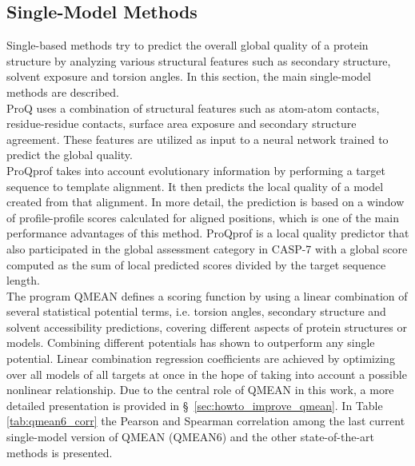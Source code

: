 \subsection{Single-Model Methods}
\label{subsec:single_model_methods}
Single-based methods try to predict the overall global quality of a protein structure by analyzing various structural features such as secondary structure, solvent exposure and torsion angles. In this section, the main single-model methods are described.\\
ProQ \cite{Wallner2007} uses a combination of structural features such as atom-atom contacts, residue-residue contacts, surface area exposure and secondary structure agreement. These features are utilized as input to a neural network trained to predict the global quality.\\
ProQprof \cite{Wallner2007} takes into account evolutionary information by performing a target sequence to template alignment. It then predicts the local quality of a model created from that alignment. In more detail, the prediction is based on a window of profile-profile scores calculated for aligned positions, which is one of the main performance advantages of this method. ProQprof is a local quality predictor that also participated in the global assessment category in CASP-7 with a global score computed as the sum of local predicted scores divided by the target sequence length. \\
The program \gls{QMEAN} \cite{Benkert2007, Benkert2008ab, Benkert2008aa, Tosatto2002} defines a scoring function by using a linear combination of several statistical potential terms, i.e. torsion angles, secondary structure and solvent accessibility predictions, covering different aspects of protein structures or models. Combining different potentials has shown to outperform any single potential. Linear combination regression coefficients are achieved by optimizing over all models of all targets at once in the hope of taking into account a possible nonlinear relationship. Due to the central role of QMEAN in this work, a more detailed presentation is provided in \S~\ref{sec:howto_improve_qmean}. In Table \ref{tab:qmean6_corr} the Pearson and Spearman correlation among the last current single-model version of QMEAN (QMEAN6) and the other state-of-the-art methods is presented.\\
